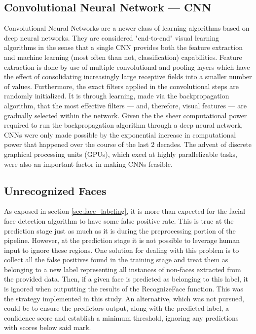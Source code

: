 \documentclass[11pt]{article}
\begin{document}
    \subsection{Convolutional Neural Network --- CNN}\label{CNN}
        Convolutional Neural Networks are a newer class of learning algorithms based on deep neural networks. They are considered "end-to-end" visual learning algorithms in the sense that a single CNN provides both the feature extraction and machine learning (most often than not, classification) capabilities. Feature extraction is done by use of multiple convolutional and pooling layers which have the effect of consolidating increasingly large receptive fields into a smaller number of values. Furthermore, the exact filters applied in the convolutional steps are randomly initialized. It is through learning, made via the backpropagation algorithm, that the most effective filters --- and, therefore, visual features --- are gradually selected within the network. Given the the sheer computational power required to run the backpropagation algorithm through a deep neural network, CNNs were only made possible by the exponential increase in computational power that happened over the course of the last 2 decades. The advent of discrete graphical processing units (GPUs), which excel at highly parallelizable tasks, were also an important factor in making CNNs feasible.

    \subsection{Unrecognized Faces}\label{sec:non-faces}
        As exposed in section \ref{sec:face_labeling}, it is more than expected for the facial face detection algorithm to have some false positive rate. This is true at the prediction stage just as much as it is during the preprocessing portion of the pipeline. However, at the prediction stage it is not possible to leverage human input to ignore these regions. One solution for dealing with this problem is to collect all the false positives found in the training stage and treat them as belonging to a new label representing all instances of non-faces extracted from the provided data. Then, if a given face is predicted as belonging to this label, it is ignored when outputting the results of the RecognizeFace function. This was the strategy implemented in this study. An alternative, which was not pursued, could be to ensure the predictors output, along with the predicted label, a confidence score and establish a minimum threshold, ignoring any predictions with scores below said mark.
\end{document}
